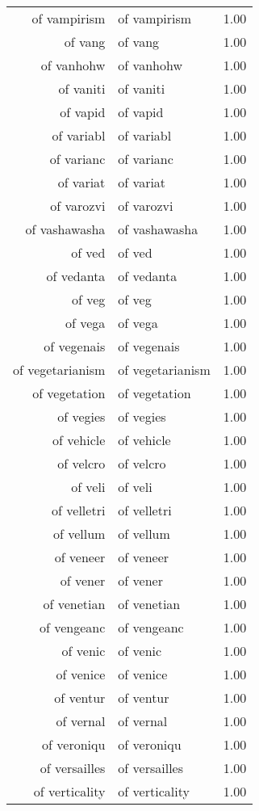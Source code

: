 \begin{table}[ht]
\begin{tabular}{rlr}
  of vampirism & of vampirism & 1.00 \\ 
  of vang & of vang & 1.00 \\ 
  of vanhohw & of vanhohw & 1.00 \\ 
  of vaniti & of vaniti & 1.00 \\ 
  of vapid & of vapid & 1.00 \\ 
  of variabl & of variabl & 1.00 \\ 
  of varianc & of varianc & 1.00 \\ 
  of variat & of variat & 1.00 \\ 
  of varozvi & of varozvi & 1.00 \\ 
  of vashawasha & of vashawasha & 1.00 \\ 
  of ved & of ved & 1.00 \\ 
  of vedanta & of vedanta & 1.00 \\ 
  of veg & of veg & 1.00 \\ 
  of vega & of vega & 1.00 \\ 
  of vegenais & of vegenais & 1.00 \\ 
  of vegetarianism & of vegetarianism & 1.00 \\ 
  of vegetation & of vegetation & 1.00 \\ 
  of vegies & of vegies & 1.00 \\ 
  of vehicle & of vehicle & 1.00 \\ 
  of velcro & of velcro & 1.00 \\ 
  of veli & of veli & 1.00 \\ 
  of velletri & of velletri & 1.00 \\ 
  of vellum & of vellum & 1.00 \\ 
  of veneer & of veneer & 1.00 \\ 
  of vener & of vener & 1.00 \\ 
  of venetian & of venetian & 1.00 \\ 
  of vengeanc & of vengeanc & 1.00 \\ 
  of venic & of venic & 1.00 \\ 
  of venice & of venice & 1.00 \\ 
  of ventur & of ventur & 1.00 \\ 
  of vernal & of vernal & 1.00 \\ 
  of veroniqu & of veroniqu & 1.00 \\ 
  of versailles & of versailles & 1.00 \\ 
  of verticality & of verticality & 1.00 \\ 

\end{tabular}
\end{table}
